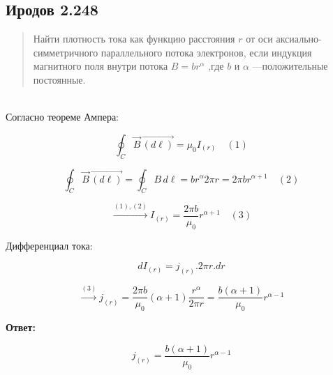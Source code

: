 \subsection*{Иродов 2.248}
\setcounter{equation}{0}

\begin{abstract}
Найти плотность тока как функцию расстояния $r$ от оси аксиально-симметричного параллельного потока электронов, если индукция магнитного поля внутри потока $B=br^{\alpha}$ ,где $b$ и $\alpha $ —положительные постоянные.
\end{abstract}

\noindent \hrulefill
\\

Согласно теореме Ампера:

$$\oint_C \vec{B} \, \vec{(d \ell)} = \mu_0 I_(r) \quad (1)$$

$$\oint_C \vec{B} \, \vec{(d \ell)} = \oint_C B \,d \ell = b r^{\alpha} 2 \pi r = 2 \pi b r^{\alpha + 1} \quad (2)$$

$$\xrightarrow[]{(1), (2)} I_(r) = \frac{2 \pi b}{\mu_0} r^{\alpha + 1} \quad (3)$$

Дифференциал тока:

$$dI_(r) = j_(r).2 \pi r. dr$$

$$\xrightarrow[]{(3)} j_(r) = \frac{2 \pi b}{\mu_0} (\alpha +1) \frac{r^{\alpha}}{2 \pi r} = \frac{b(\alpha +1)}{\mu_0} r^{\alpha-1}$$

\textbf{Ответ:}

$$j_(r) =  \frac{b(\alpha +1)}{\mu_0} r^{\alpha-1}$$